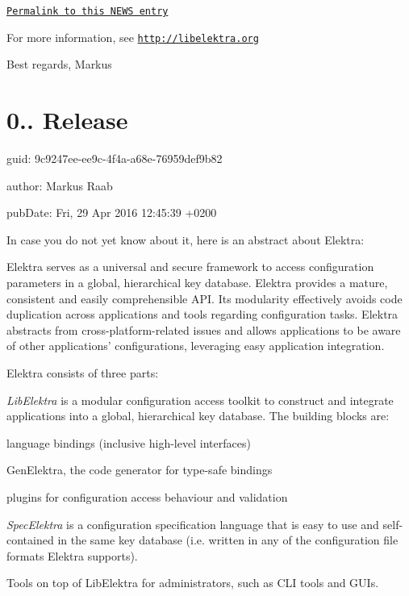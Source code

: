 \href{http://doc.libelektra.org/news/e6153a39-c4bd-41c3-bc86-785d451eb6c5.html}{\tt Permalink to this N\+E\+W\+S entry}

For more information, see \href{http://libelektra.org}{\tt http\+://libelektra.\+org}

Best regards, Markus

\section*{0.. Release}


\begin{DoxyItemize}
\item guid\+: 9c9247ee-\/ee9c-\/4f4a-\/a68e-\/76959def9b82
\item author\+: Markus Raab
\item pub\+Date\+: Fri, 29 Apr 2016 12\+:45\+:39 +0200
\end{DoxyItemize}

In case you do not yet know about it, here is an abstract about Elektra\+:

Elektra serves as a universal and secure framework to access configuration parameters in a global, hierarchical key database. Elektra provides a mature, consistent and easily comprehensible A\+P\+I. Its modularity effectively avoids code duplication across applications and tools regarding configuration tasks. Elektra abstracts from cross-\/platform-\/related issues and allows applications to be aware of other applications' configurations, leveraging easy application integration.

Elektra consists of three parts\+:


\begin{DoxyEnumerate}
\item {\itshape Lib\+Elektra} is a modular configuration access toolkit to construct and integrate applications into a global, hierarchical key database. The building blocks are\+:
\begin{DoxyItemize}
\item language bindings (inclusive high-\/level interfaces)
\item Gen\+Elektra, the code generator for type-\/safe bindings
\item plugins for configuration access behaviour and validation
\end{DoxyItemize}
\item {\itshape Spec\+Elektra} is a configuration specification language that is easy to use and self-\/contained in the same key database (i.\+e. written in any of the configuration file formats Elektra supports).
\item Tools on top of Lib\+Elektra for administrators, such as C\+L\+I tools and G\+U\+Is.
\end{DoxyEnumerate}

